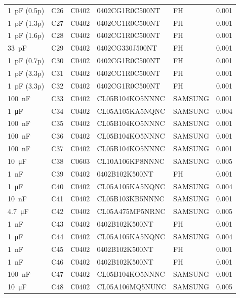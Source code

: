\begin{appendices}
\begin{footnotesize}
\begin{longtable}{llllll}
    \SI{1}{\pico\farad} (0.5p) & C26 & C0402 & 0402CG1R0C500NT & FH & 0.001 \\
    \SI{1}{\pico\farad} (1.3p) & C27 & C0402 & 0402CG1R0C500NT & FH & 0.001 \\
    \SI{1}{\pico\farad} (1.6p) & C28 & C0402 & 0402CG1R0C500NT & FH & 0.001 \\
    \SI{33}{\pico\farad} & C29 & C0402 & 0402CG330J500NT & FH & 0.001 \\
    \SI{1}{\pico\farad} (0.7p) & C30 & C0402 & 0402CG1R0C500NT & FH & 0.001 \\
    \SI{1}{\pico\farad} (3.3p) & C31 & C0402 & 0402CG1R0C500NT & FH & 0.001 \\
    \SI{1}{\pico\farad} (3.3p) & C32 & C0402 & 0402CG1R0C500NT & FH & 0.001 \\
    \SI{100}{\nano\farad} & C33 & C0402 & CL05B104KO5NNNC & SAMSUNG & 0.001 \\
    \SI{1}{\micro\farad} & C34 & C0402 & CL05A105KA5NQNC & SAMSUNG & 0.004 \\
    \SI{100}{\nano\farad} & C35 & C0402 & CL05B104KO5NNNC & SAMSUNG & 0.001 \\
    \SI{100}{\nano\farad} & C36 & C0402 & CL05B104KO5NNNC & SAMSUNG & 0.001 \\
    \SI{100}{\nano\farad} & C37 & C0402 & CL05B104KO5NNNC & SAMSUNG & 0.001 \\
    \SI{10}{\micro\farad} & C38 & C0603 & CL10A106KP8NNNC & SAMSUNG & 0.005 \\
    \SI{1}{\nano\farad} & C39 & C0402 & 0402B102K500NT & FH & 0.001 \\
    \SI{1}{\micro\farad} & C40 & C0402 & CL05A105KA5NQNC & SAMSUNG & 0.004 \\
    \SI{10}{\nano\farad} & C41 & C0402 & CL05B103KB5NNNC & SAMSUNG & 0.001 \\
    \SI{4.7}{\micro\farad} & C42 & C0402 & CL05A475MP5NRNC & SAMSUNG & 0.005 \\
    \SI{1}{\nano\farad} & C43 & C0402 & 0402B102K500NT & FH & 0.001 \\
    \SI{1}{\micro\farad} & C44 & C0402 & CL05A105KA5NQNC & SAMSUNG & 0.004 \\
    \SI{1}{\nano\farad} & C45 & C0402 & 0402B102K500NT & FH & 0.001 \\
    \SI{1}{\nano\farad} & C46 & C0402 & 0402B102K500NT & FH & 0.001 \\
    \SI{100}{\nano\farad} & C47 & C0402 & CL05B104KO5NNNC & SAMSUNG & 0.001 \\
    \SI{10}{\micro\farad} & C48 & C0402 & CL05A106MQ5NUNC & SAMSUNG & 0.005 \\

\end{longtable}
\end{footnotesize}
\end{appendices}
